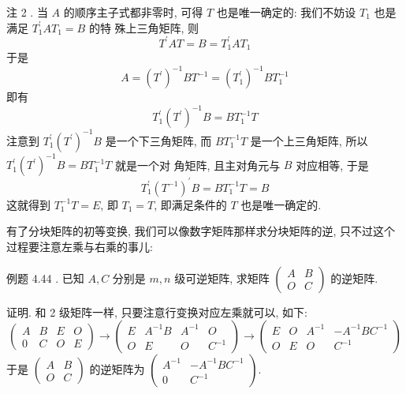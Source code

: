 \documentclass{article}
\begin{document}
{\heiti 注 2 .} 当 $A$ 的顺序主子式都非零时, 可得 $T$ 也是唯一确定的: 我们不妨设 $T_{1}$ 也是满足 $T_{1}^{\prime} A T_{1}=B$ 的特 殊上三角矩阵, 则
\begin{equation*}
    T^{\prime} A T=B=T_{1}^{\prime} A T_{1}
\end{equation*}
于是
\begin{equation*}
    A=\left(T^{\prime}\right)^{-1} B T^{-1}=\left(T_{1}^{\prime}\right)^{-1} B T_{1}^{-1}
\end{equation*}
即有
\begin{equation*}
    T_{1}^{\prime}\left(T^{\prime}\right)^{-1} B=B T_{1}^{-1} T
\end{equation*}
注意到 $T_{1}^{\prime}\left(T^{\prime}\right)^{-1} B$ 是一个下三角矩阵, 而 $B T_{1}^{-1} T$ 是一个上三角矩阵, 所以 $T_{1}^{\prime}\left(T^{\prime}\right)^{-1} B=B T_{1}^{-1} T$ 就是一个对
角矩阵, 且主对角元与 $B$ 对应相等, 于是
\begin{equation*}
    T_{1}^{\prime}\left(T^{-1}\right)^{\prime} B=B T_{1}^{-1} T=B
\end{equation*}
这就得到 $T_{1}^{-1} T=E$, 即 $T_{1}=T$, 即满足条件的 $T$ 也是唯一确定的.

有了分块矩阵的初等变换, 我们可以像数字矩阵那样求分块矩阵的逆, 只不过这个过程要注意左乘与右乘的事儿:

{\heiti 例题 4.44 .} {\kaishu 已知 $A, C$ 分别是 $m, n$ 级可逆矩阵, 求矩阵 $\left(\begin{array}{cc}A & B \\ O & C\end{array}\right)$ 的逆矩阵.}

\vspace{1ex}
{\heiti 证明.} 和 2 级矩阵一样, 只要注意行变换对应左乘就可以, 如下:
\begin{equation*}
    \left(\begin{array}{cccc}
        A & B & E & O \\
        0 & C & O & E
    \end{array}\right) \rightarrow\left(\begin{array}{cccc}
        E & A^{-1} B & A^{-1} & O      \\
        O & E        & O      & C^{-1}
    \end{array}\right) \rightarrow\left(\begin{array}{cccc}
        E & O & A^{-1} & -A^{-1} B C^{-1} \\
        O & E & O      & C^{-1}
    \end{array}\right)
\end{equation*}
于是 $\left(\begin{array}{ll}A & B \\ O & C\end{array}\right)$ 的逆矩阵为 $\left(\begin{array}{cc}A^{-1} & -A^{-1} B C^{-1} \\ 0 & C^{-1}\end{array}\right) .$
\end{document}
